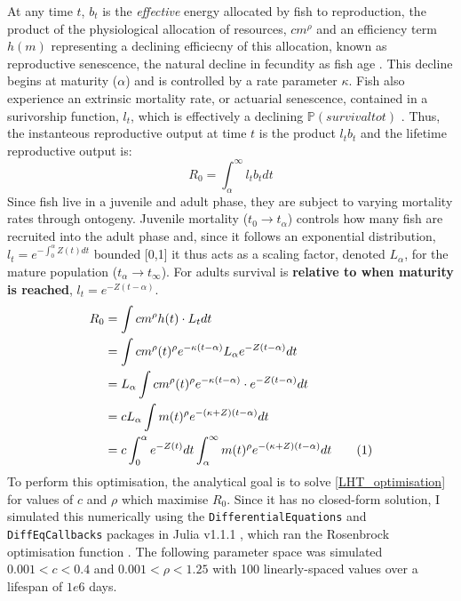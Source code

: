 \documentclass[a4paper]{article} %
\newcommand\numberthis{\addtocounter{equation}{1}\tag{\theequation}}
\begin{document}
At any time $t$, $b_{t}$ is the \textit{effective} energy allocated by fish to reproduction, the product of the physiological allocation of resources, $cm^{\rho}$ and an efficiency term $h(m)$ representing a declining efficiecny of this allocation, known as reproductive senescence, the natural decline in fecundity as fish age \autocite{Stearns2000, Benoit2018, Vrtilek2018}. This decline begins at maturity ($\alpha$) and is controlled by a rate parameter $\kappa$. Fish also experience an extrinsic mortality rate, or actuarial senescence, contained in a surivorship function, $l_t$, which is effectively a declining $\mathbb{P}(survival to t)$ \autocite{Charnov1993, Charnov2001, Benoit2018, Laird2010, Reznick2002, Reznick2006}. Thus, the instanteous reproductive output at time $t$ is the product $l_{t}b_{t}$ and the lifetime reproductive output is:
\begin{equation}
    R_{0} = \int_{\alpha}^{\infty}l_{t}b_{t} dt
\end{equation}
Since fish live in a juvenile and adult phase, they are subject to varying mortality rates through ontogeny. Juvenile mortality ($t_0 \rightarrow t_{\alpha}$) controls how many fish are recruited into the adult phase and, since it follows an exponential distribution, $l_t = e^{-\int_{0}^{\alpha}Z(t)dt}$ bounded [0,1] it thus acts as a scaling factor, denoted $L_{\alpha}$, for the mature population ($t_{\alpha} \rightarrow t_{\infty}$). For adults survival is \textbf{relative to when maturity is reached}, $l_{t} = e^{-Z(t-\alpha)}$.
\begin{align*}
    R_{0} &= \int cm^{\rho}h(t) \cdot L_{t} dt \\
          &= \int cm^{\rho}(t)^{\rho} e^{-\kappa(t-\alpha)} L_{\alpha}e^{-Z(t-\alpha)} dt \\
          &= L_{\alpha}\int cm^{\rho}(t)^{\rho} e^{-\kappa(t-\alpha)} \cdot e^{-Z(t-\alpha)} dt \\
          &= cL_{\alpha}\int m(t)^{\rho} e^{-(\kappa+Z)(t-\alpha)} dt \\
          &= c\int_{0}^{\alpha}e^{-Z(t)}dt\int_{\alpha}^{\infty} m(t)^{\rho} e^{-(\kappa+Z)(t-\alpha)} dt \numberthis \label{LHT_optimisation}
\end{align*}
To perform this optimisation, the analytical goal is to solve \cref{LHT_optimisation} for values of $c$ and $\rho$ which maximise $R_0$. Since it has no closed-form solution, I simulated this numerically using the \texttt{DifferentialEquations} and \texttt{DiffEqCallbacks} packages in Julia v1.1.1 \autocite{Bezanson2017}, which ran the Rosenbrock optimisation function \autocite{Rosenbrock1960}. The following parameter space was simulated $0.001 < c < 0.4$ and $0.001 < \rho < 1.25$ with 100 linearly-spaced values over a lifespan of $1e6$ days.
\end{document}
